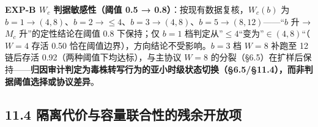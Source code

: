 \documentclass[
]{ctexart}
\begin{document}
\textbf{EXP-B \(W_c\) 判据敏感性（阈值 0.5 →
0.8）}：按现有数据复核，\(W_c(b)\) 为
\(b{=}1\to(4,8)\)、\(b{=}2\to\le4\)、\(b{=}3\to(4,8)\)、\(b{=}5\to(8,12)\)------``\(b\)
升 → \(M_c\) 升''的定性结论在阈值 0.8 下保持；仅 \(b{=}1\)
档判定从''\(\le4\)``变为''\(\in(4,8)\)``（\(W{=}4\) 存活 0.50
恰在阈值边界），方向结论不受影响。\(b{=}3\) 档 \(W{=}8\) 补跑至 12
链后存活 0.92（两种阈值下均达标），与主协议 \(W{=}8\)
的分裂（§6.5）在扩样后保持------\textbf{归因审计判定为毒株转写行为的亚小时级状态切换（§6.5/§11.4），而非判据阈值选择或协议差异}。

\subsection{11.4
隔离代价与容量联合性的残余开放项}\label{ux9694ux79bbux4ee3ux4ef7ux4e0eux5bb9ux91cfux8054ux5408ux6027ux7684ux6b8bux4f59ux5f00ux653eux9879}
\end{document}
